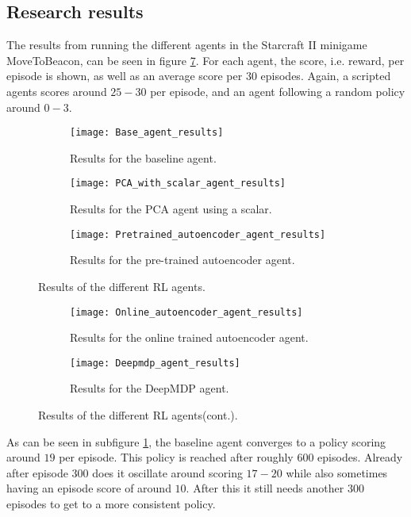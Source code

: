 \subsection{Research results}\label{research-general-results}
The results from running the different agents in the Starcraft II minigame MoveToBeacon, can be seen in figure \ref{fig:results-agents}. For each agent, the score, i.e. reward, per episode is shown, as well as an average score per $30$ episodes. Again, a scripted agents scores around $25-30$ per episode, and an agent following a random policy around $0-3$.


\begin{figure}[h]
	\centering
	\begin{subfigure}[b]{0.75\textwidth}
		\texttt{[image: Base\_agent\_results]}
		\caption{Results for the baseline agent.}
		\label{fig:results-base} 
	\end{subfigure}
	\begin{subfigure}[b]{0.75\textwidth}
		\texttt{[image: PCA\_with\_scalar\_agent\_results]}
		\caption{Results for the PCA agent using a scalar.}
		\label{fig:results-pca}
	\end{subfigure}
	\begin{subfigure}[b]{0.75\textwidth}
		\texttt{[image: Pretrained\_autoencoder\_agent\_results]}
		\caption{Results for the pre-trained autoencoder agent.}
		\label{fig:results-ae}
	\end{subfigure}
	\caption{Results of the different RL agents.}
\end{figure}%
\begin{figure}[ht]\ContinuedFloat
	\begin{subfigure}[b]{0.75\textwidth}
		\texttt{[image: Online\_autoencoder\_agent\_results]}
		\caption{Results for the online trained autoencoder agent.}
		\label{fig:results-online-ae}
	\end{subfigure}
	\begin{subfigure}[b]{0.75\textwidth}
		\texttt{[image: Deepmdp\_agent\_results]}
		\caption{Results for the DeepMDP agent.}
		\label{fig:results-deepmdp}
	\end{subfigure}
	\caption{Results of the different RL agents(cont.).}
	\label{fig:results-agents}
\end{figure}

As can be seen in subfigure \ref{fig:results-base}, the baseline agent converges to a policy scoring around $19$ per episode. This policy is reached after roughly $600$ episodes. Already after episode $300$ does it oscillate around scoring $17-20$ while also sometimes having an episode score of around $10$. After this it still needs another $300$ episodes to get to a more consistent policy.

